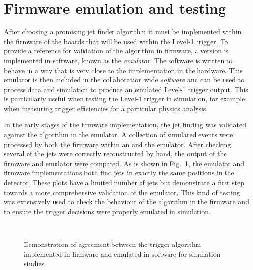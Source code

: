 \section{Firmware emulation and testing}
\label{sec:emu}

After choosing a promising jet finder algorithm it must be implemented
within the firmware of the \FPGA boards that will be used within the
Level-1 trigger. To provide a reference for validation of the
algorithm in firmware, a version is implemented in software, known as
the \emph{emulator}. The software is written to behave in a way that
is very close to the implementation in the \FPGA hardware. This
emulator is then included in the collaboration wide \emph{\CMS
software} and can be used to process data and simulation to produce an
emulated Level-1 trigger output. This is particularly useful when
testing the Level-1 trigger in simulation, for example when measuring
trigger efficiencies for a particular physics analysis. 

In the early stages of the firmware implementation, the jet finding
was validated against the algorithm in the emulator. A collection of
simulated events were processed by both the firmware within an \FPGA
and the emulator. After checking several of the jets were correctly
reconstructed by hand, the output of the firmware and emulator were
compared. As is shown in Fig.~\ref{fig:firmwareEmu}, the emulator and
firmware implementations both find jets in exactly the same positions
in the detector. These plots have a limited number of jets but demonstrate a first step towards a more
comprehensive validation of the emulator. This kind of testing was
extensively used to check the behaviour of the algorithm in the
firmware and to ensure the trigger decisions were properly emulated
in simulation.

\begin{figure}
  \centering
  ~ 
  \caption{Demonstration of agreement between the trigger algorithm
  implemented in firmware and emulated in software for simulation
  studies}
  \label{fig:firmwareEmu}
\end{figure}


